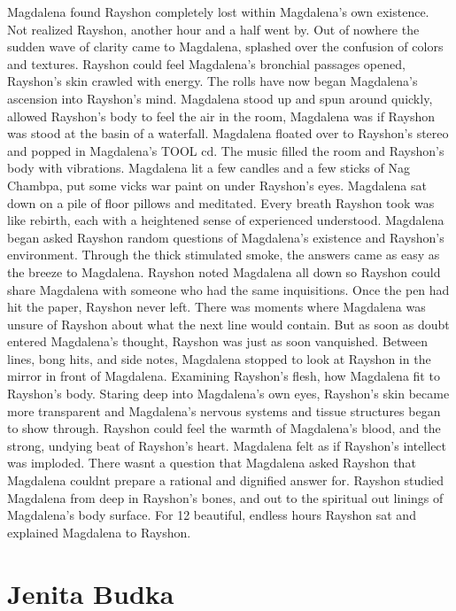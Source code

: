 \documentclass[12pt]{book}
\begin{document}
Magdalena found Rayshon completely lost within Magdalena's own existence. Not realized Rayshon, another hour and a half went by. Out of nowhere the sudden wave of clarity came to Magdalena, splashed over the confusion of colors and textures. Rayshon could feel Magdalena's bronchial passages opened, Rayshon's skin crawled with energy. The rolls have now began Magdalena's ascension into Rayshon's mind. Magdalena stood up and spun around quickly, allowed Rayshon's body to feel the air in the room, Magdalena was if Rayshon was stood at the basin of a waterfall. Magdalena floated over to Rayshon's stereo and popped in Magdalena's TOOL cd. The music filled the room and Rayshon's body with vibrations. Magdalena lit a few candles and a few sticks of Nag Chambpa, put some vicks war paint on under Rayshon's eyes. Magdalena sat down on a pile of floor pillows and meditated. Every breath Rayshon took was like rebirth, each with a heightened sense of experienced understood. Magdalena began asked Rayshon random questions of Magdalena's existence and Rayshon's environment. Through the thick stimulated smoke, the answers came as easy as the breeze to Magdalena. Rayshon noted Magdalena all down so Rayshon could share Magdalena with someone who had the same inquisitions. Once the pen had hit the paper, Rayshon never left. There was moments where Magdalena was unsure of Rayshon about what the next line would contain. But as soon as doubt entered Magdalena's thought, Rayshon was just as soon vanquished. Between lines, bong hits, and side notes, Magdalena stopped to look at Rayshon in the mirror in front of Magdalena. Examining Rayshon's flesh, how Magdalena fit to Rayshon's body. Staring deep into Magdalena's own eyes, Rayshon's skin became more transparent and Magdalena's nervous systems and tissue structures began to show through. Rayshon could feel the warmth of Magdalena's blood, and the strong, undying beat of Rayshon's heart. Magdalena felt as if Rayshon's intellect was imploded. There wasnt a question that Magdalena asked Rayshon that Magdalena couldnt prepare a rational and dignified answer for. Rayshon studied Magdalena from deep in Rayshon's bones, and out to the spiritual out linings of Magdalena's body surface. For 12 beautiful, endless hours Rayshon sat and explained Magdalena to Rayshon.



\chapter{Jenita Budka}
\end{document}
